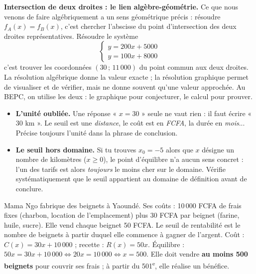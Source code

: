 \documentclass[11pt]{article}
\newcommand{\cle}[1]{{\popxbold\color{popdark}#1}}
\begin{document}
\textbf{Intersection de deux droites : le lien algèbre-géométrie.} Ce que nous venons de faire algébriquement a un sens géométrique précis : résoudre $f_A(x) = f_B(x)$, c'est chercher l'abscisse du point d'intersection des deux droites représentatives. Résoudre le système
\[
\begin{cases} y = 200x + 5000 \\ y = 100x + 8000 \end{cases}
\]
c'est trouver les coordonnées $(30\,;\,11\,000)$ du point commun aux deux droites. La \cle{résolution algébrique} donne la valeur exacte ; la \cle{résolution graphique} permet de visualiser et de vérifier, mais ne donne souvent qu'une valeur approchée. Au BEPC, on utilise les deux : le graphique pour conjecturer, le calcul pour prouver.

\begin{attention}
\begin{itemize}
\item \textbf{L'unité oubliée.} Une réponse « $x = 30$ » seule ne vaut rien : il faut écrire « 30 km ». Le seuil est une \emph{distance}, le coût est en \emph{FCFA}, la durée en \emph{mois}... Précise toujours l'unité dans la phrase de conclusion.
\item \textbf{Le seuil hors domaine.} Si tu trouves $x_0 = -5$ alors que $x$ désigne un nombre de kilomètres ($x \geq 0$), le point d'équilibre n'a aucun sens concret : l'un des tarifs est alors \emph{toujours} le moins cher sur le domaine. Vérifie systématiquement que le seuil appartient au domaine de définition avant de conclure.
\end{itemize}
\end{attention}

\begin{exemplebox}
Mama Ngo fabrique des beignets à Yaoundé. Ses coûts : 10\,000 FCFA de frais fixes (charbon, location de l'emplacement) plus 30 FCFA par beignet (farine, huile, sucre). Elle vend chaque beignet 50 FCFA. Le \cle{seuil de rentabilité} est le nombre de beignets à partir duquel elle commence à gagner de l'argent. Coût : $C(x) = 30x + 10\,000$ ; recette : $R(x) = 50x$. Équilibre : $50x = 30x + 10\,000 \Leftrightarrow 20x = 10\,000 \Leftrightarrow x = 500$. Elle doit vendre \textbf{au moins 500 beignets} pour couvrir ses frais ; à partir du 501\textsuperscript{e}, elle réalise un bénéfice.
\end{exemplebox}
\end{document}
